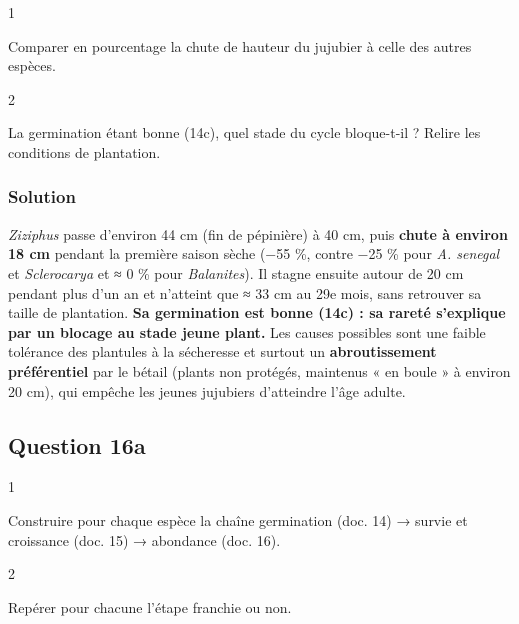 \documentclass[11pt,a4paper]{article}
\begin{document}
\begin{indication}{1}

Comparer en pourcentage la chute de hauteur du jujubier à celle des autres espèces.

\end{indication}

\begin{indication}{2}

La germination étant bonne (14c), quel stade du cycle bloque-t-il ? Relire les conditions de plantation.

\end{indication}

\hypertarget{solution-44}{%
\subsubsection{Solution}\label{solution-44}}

\emph{Ziziphus} passe d'environ 44 cm (fin de pépinière) à 40 cm, puis \textbf{chute à environ 18 cm} pendant la première saison sèche (−55 \%, contre −25 \% pour \emph{A. senegal} et \emph{Sclerocarya} et ≈ 0 \% pour \emph{Balanites}). Il stagne ensuite autour de 20 cm pendant plus d'un an et n'atteint que ≈ 33 cm au 29e mois, sans retrouver sa taille de plantation. \textbf{Sa germination est bonne (14c) : sa rareté s'explique par un blocage au stade jeune plant.} Les causes possibles sont une faible tolérance des plantules à la sécheresse et surtout un \textbf{abroutissement préférentiel} par le bétail (plants non protégés, maintenus « en boule » à environ 20 cm), qui empêche les jeunes jujubiers d'atteindre l'âge adulte.

\hypertarget{question-16a}{%
\subsection{Question 16a}\label{question-16a}}

\begin{indication}{1}

Construire pour chaque espèce la chaîne germination (doc. 14) → survie et croissance (doc. 15) → abondance (doc. 16).

\end{indication}

\begin{indication}{2}

Repérer pour chacune l'étape franchie ou non.

\end{indication}
\end{document}
